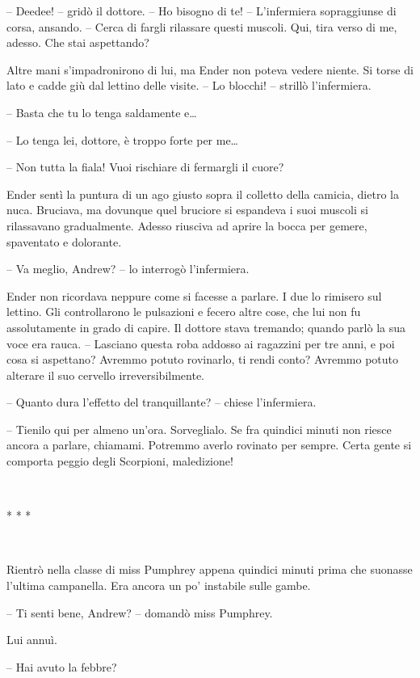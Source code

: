 {-- Deedee! -- gridò il dottore. -- Ho bisogno di te! -- L'infermiera
	sopraggiunse di corsa, ansando. -- Cerca di fargli rilassare questi
	muscoli. Qui, tira verso di me, adesso. Che stai aspettando?}

{Altre mani s'impadronirono di lui, ma Ender non poteva vedere niente.
	Si torse di lato e cadde giù dal lettino delle visite. -- Lo blocchi! --
	strillò l'infermiera.}

{-- Basta che tu lo tenga saldamente e\ldots{}}

{-- Lo tenga lei, dottore, è troppo forte per me\ldots{}}

{-- Non tutta la fiala! Vuoi rischiare di fermargli il cuore?}

{Ender sentì la puntura di un ago giusto sopra il colletto della
	camicia, dietro la nuca. Bruciava, ma dovunque quel bruciore si
	espandeva i suoi muscoli si rilassavano gradualmente. Adesso riusciva ad
	aprire la bocca per gemere, spaventato e dolorante.}

{-- Va meglio, Andrew? -- lo interrogò l'infermiera.}

{Ender non ricordava neppure come si facesse a parlare. I due lo
	rimisero sul lettino. Gli controllarono le pulsazioni e fecero altre
	cose, che lui non fu assolutamente in grado di capire. Il dottore stava
	tremando; quando parlò la sua voce era rauca. -- Lasciano questa roba
	addosso ai ragazzini per tre anni, e poi cosa si aspettano? Avremmo
	potuto rovinarlo, ti rendi conto? Avremmo potuto alterare il suo
	cervello irreversibilmente.}

{-- Quanto dura l'effetto del tranquillante? -- chiese l'infermiera.}

{-- Tienilo qui per almeno un'ora. Sorveglialo. Se fra quindici minuti
	non riesce ancora a parlare, chiamami. Potremmo averlo rovinato per
	sempre. Certa gente si comporta peggio degli Scorpioni, maledizione!}

{~}

\begin{center}
	{* * *}
\end{center}

{~}

{Rientrò nella classe di miss Pumphrey appena quindici minuti prima che
	suonasse l'ultima campanella. Era ancora un po' instabile sulle gambe.}

{-- Ti senti bene, Andrew? -- domandò miss Pumphrey.}

{Lui annuì.}

{-- Hai avuto la febbre?}

